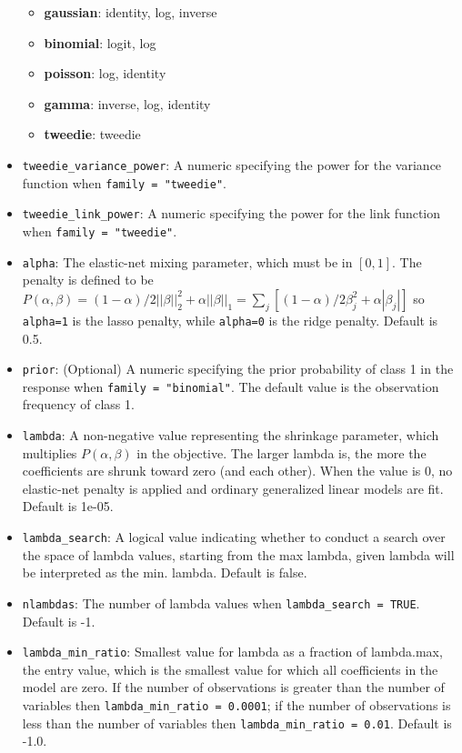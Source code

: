 \begin{itemize}
	\begin{itemize}
\item	{\textbf {gaussian}}: identity, log, inverse 
\item {\textbf{binomial}}: logit, log 
\item {\textbf{poisson}}: log, identity
\item {\textbf{gamma}}: inverse, log, identity
\item {\textbf{tweedie}}: tweedie 
	\end{itemize}
\item \texttt{tweedie\_variance\_power}: A numeric specifying the power for the variance function when \texttt{family = "tweedie"}. 
\item \texttt{tweedie\_link\_power}: A numeric specifying the power for the link function when \texttt{family = "tweedie"}. 
\item \texttt{alpha}: The elastic-net mixing parameter, which must be in $[0,1]$. The penalty is defined to be $P(\alpha,\beta) = (1-\alpha)/2||\beta||_2^2 + \alpha||\beta||_1 = \sum_j [(1-\alpha)/2 \beta_j^2 + \alpha|\beta_j|] $ so \texttt{alpha=1} is the lasso penalty, while \texttt{alpha=0} is the ridge penalty. Default is 0.5.
\item \texttt{prior}: (Optional) A numeric specifying the prior probability of class 1 in the response when \texttt{family = "binomial"}. The default value is the observation frequency of class 1. 
\item \texttt{lambda}: A non-negative value representing the shrinkage parameter, which multiplies $P(\alpha,\beta)$ in the objective. The larger lambda is, the more the coefficients are shrunk toward zero (and each other). When the value is 0, no elastic-net penalty is applied and ordinary generalized linear models are fit. Default is 1e-05.
\item \texttt{lambda\_search}: A logical value indicating whether to conduct a search over the space of lambda values, starting from the max lambda, given lambda will be interpreted as the min. lambda. Default is false.
\item \texttt{nlambdas}: The number of lambda values when \texttt{lambda\_search = TRUE}. Default is -1.
\item \texttt{lambda\_min\_ratio}: Smallest value for lambda as a fraction of lambda.max, the entry value, which is the smallest value for which all coefficients in the model are zero. If the number of observations is greater than the number of variables then \texttt{lambda\_min\_ratio = 0.0001}; if the number of observations is less than the number of variables then \texttt{lambda\_min\_ratio = 0.01}. Default is -1.0.

\end{itemize}

